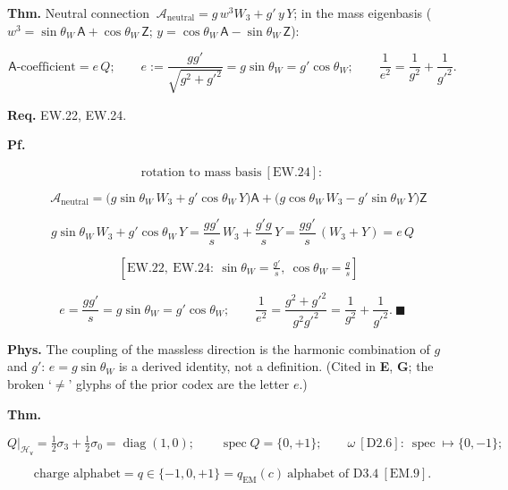 \begin{theorem}\label{tag:EW-35}
\textbf{Thm.} Neutral connection $\ \mathcal A_{\mathrm{neutral}}=g\,w^3W_3+g'\,y\,Y$; in the mass eigenbasis ($w^3=\sin\theta_W\,\mathsf A+\cos\theta_W\,\mathsf Z$; $y=\cos\theta_W\,\mathsf A-\sin\theta_W\,\mathsf Z$):

\[
\mathsf A\text{-coefficient}=e\,Q;\qquad
e:=\frac{gg'}{\sqrt{g^2+g'^2}}=g\sin\theta_W=g'\cos\theta_W;\qquad
\frac1{e^2}=\frac1{g^2}+\frac1{g'^2}.
\]

\textbf{Req.} EW.22, EW.24.

\textbf{Pf.}

\[
\text{rotation to mass basis}\ [\mathrm{EW.24}]:
\]

\[
\quad \mathcal A_{\mathrm{neutral}}=\bigl(g\sin\theta_W\,W_3+g'\cos\theta_W\,Y\bigr)\mathsf A+\bigl(g\cos\theta_W\,W_3-g'\sin\theta_W\,Y\bigr)\mathsf Z
\]

\[
g\sin\theta_W\,W_3+g'\cos\theta_W\,Y=\frac{gg'}{s}\,W_3+\frac{g'g}{s}\,Y=\frac{gg'}{s}\,(W_3+Y)=e\,Q
\]

\[
\quad [\mathrm{EW.22},\ \mathrm{EW.24}:\ \sin\theta_W=\tfrac{g'}s,\ \cos\theta_W=\tfrac gs]
\]

\[
e=\frac{gg'}{s}=g\sin\theta_W=g'\cos\theta_W;\qquad
\frac1{e^2}=\frac{g^2+g'^2}{g^2g'^2}=\frac1{g^2}+\frac1{g'^2}.\ \blacksquare
\]

\textbf{Phys.} The coupling of the massless direction is the harmonic combination of $g$ and $g'$: $e=g\sin\theta_W$ is a derived identity, not a definition. (Cited in \textbf{E}, \textbf{G}; the broken `$\ne$’ glyphs of the prior codex are the letter $e$.)

\end{theorem}

\begin{theorem}\label{tag:EW-36}
\textbf{Thm.}

\[
Q\big|_{\mathcal H_{\mathsf v}}=\tfrac12\sigma_3+\tfrac12\sigma_0=\operatorname{diag}(1,0);\qquad
\operatorname{spec}Q=\{0,+1\};\qquad
\omega\ [\mathrm{D2.6}]:\ \operatorname{spec}\mapsto\{0,-1\};
\]

\[
\text{charge alphabet}=q\in\{-1,0,+1\}=q_{\mathrm{EM}}(c)\ \text{alphabet of D3.4}\ [\mathrm{EM.9}].
\]

\end{theorem}


